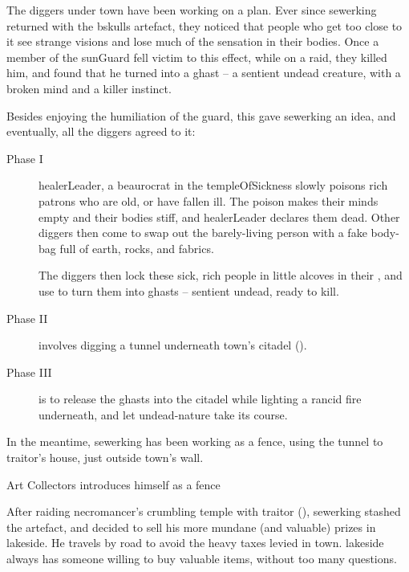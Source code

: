 \label{sewerking}

\begin{exampletext}
  \noindent
  The \glspl{digger} under \gls{town} have been working on a plan.
  Ever since \gls{sewerking} returned with the \gls{bskulls} \gls{artefact}, they noticed that people who get too close to it see strange visions and lose much of the sensation in their bodies.
  Once a member of the \gls{sunGuard} fell victim to this effect, while on a raid, they killed him, and found that he turned into a ghast -- a sentient undead creature, with a broken mind and a killer instinct.%

  Besides enjoying the humiliation of the guard, this gave \gls{sewerking} an idea, and eventually, all the \glspl{digger} agreed to it:

  \label{ghastPlan}
  \begin{description}
    \item[Phase I]
    \gls{healerLeader}, a beaurocrat in the \gls{templeOfSickness} slowly poisons rich patrons who are old, or have fallen ill.
    The poison makes their minds empty and their bodies stiff, and \gls{healerLeader} declares them dead.
    Other \glspl{digger} then come to swap out the barely-living person with a fake body-bag full of earth, rocks, and fabrics.

    The \glspl{digger} then lock these sick, rich people in little alcoves in their , and use  to turn them into ghasts -- sentient undead, ready to kill.
    \item[Phase II]
    involves digging a tunnel underneath \gls{town}'s citadel ().
    \item[Phase III]
    is to release the ghasts into the citadel while lighting a rancid fire underneath, and let undead-nature take its course.
  \end{description}

  In the meantime, \gls{sewerking} has been working as a fence, using the tunnel to \gls{traitor}'s house, just outside \gls{town}'s wall.

\end{exampletext}

{Art Collectors}%
{ introduces himself as a fence}%

\begin{exampletext}
  After raiding \gls{necromancer}'s crumbling temple with \gls{traitor} (), \gls{sewerking} stashed the \gls{artefact}, and decided to sell his more mundane (and valuable) prizes in \gls{lakeside}.
  He travels by road to avoid the heavy taxes levied in \gls{town}.
  \Gls{lakeside} always has someone willing to buy valuable items, without too many questions.
\end{exampletext}

